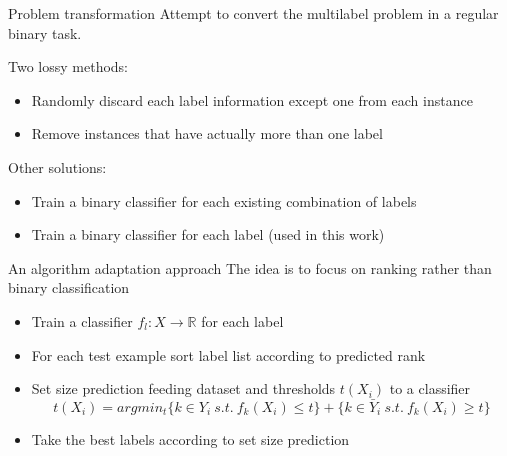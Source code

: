 \begin{frame}{Problem transformation}
	Attempt to convert the multilabel problem in a regular binary task.
	
	Two lossy methods:
	\begin{itemize}\setlength\itemsep{1em}
		\item Randomly discard each label information except one from each instance
		\item Remove instances that have actually more than one label
	\end{itemize}
	Other solutions:
	\begin{itemize}\setlength\itemsep{1em}
		\item Train a binary classifier for each existing combination of labels
		\item Train a binary classifier for each label (used in this work)
	\end{itemize}
\end{frame}

\begin{frame}{An algorithm adaptation approach}
	The idea is to focus on ranking rather than binary classification \cite{ml1}

	\begin{itemize}
		\item Train a classifier $f_l : X \rightarrow \mathbb{R}$ for each label
		\item For each test example sort label list according to predicted rank
		\item Set size prediction feeding dataset and thresholds $t(X_i)$ to a classifier
		$$t(X_i) = argmin_t\{ k \in Y_i \ s.t. \ f_k(X_i) \leq t \} + \{ k \in \bar{Y}_i \ s.t. \ f_k(X_i) \geq t \}$$
		\item Take the best labels according to set size prediction
	\end{itemize}
	
\end{frame}